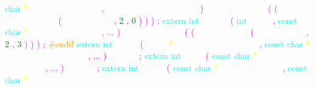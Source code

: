 \textcolor{cyan}{char} 
\textcolor{yellow}{*} 
\textcolor{white}{\_\_restrict} 
\textcolor{white}{\_\_fmt} 
\textcolor{magenta}{,} 
\textcolor{white}{\_\_gnuc\_va\_list} 
\textcolor{white}{\_\_arg} 
\textcolor{magenta}{)} 
\textcolor{white}{\_\_attribute\_\_} 
\textcolor{magenta}{(} 
\textcolor{magenta}{(} 
\textcolor{white}{\_\_format\_\_} 
\textcolor{magenta}{(} 
\textcolor{white}{\_\_printf\_\_} 
\textcolor{magenta}{,} 
\textcolor{green}{2} 
\textcolor{magenta}{,} 
\textcolor{green}{0} 
\textcolor{magenta}{)} 
\textcolor{magenta}{)} 
\textcolor{magenta}{)} 
\textcolor{magenta}{;} 
\textcolor{cyan}{extern} 
\textcolor{cyan}{int} 
\textcolor{white}{dprintf} 
\textcolor{magenta}{(} 
\textcolor{cyan}{int} 
\textcolor{white}{\_\_fd} 
\textcolor{magenta}{,} 
\textcolor{cyan}{const} 
\textcolor{cyan}{char} 
\textcolor{yellow}{*} 
\textcolor{white}{\_\_restrict} 
\textcolor{white}{\_\_fmt} 
\textcolor{magenta}{,} 
\textcolor{magenta}{...} 
\textcolor{magenta}{)} 
\textcolor{white}{\_\_attribute\_\_} 
\textcolor{magenta}{(} 
\textcolor{magenta}{(} 
\textcolor{white}{\_\_format\_\_} 
\textcolor{magenta}{(} 
\textcolor{white}{\_\_printf\_\_} 
\textcolor{magenta}{,} 
\textcolor{green}{2} 
\textcolor{magenta}{,} 
\textcolor{green}{3} 
\textcolor{magenta}{)} 
\textcolor{magenta}{)} 
\textcolor{magenta}{)} 
\textcolor{magenta}{;} 
\textcolor{orange}{\#endif} 
\textcolor{cyan}{extern} 
\textcolor{cyan}{int} 
\textcolor{white}{fscanf} 
\textcolor{magenta}{(} 
\textcolor{white}{FILE} 
\textcolor{yellow}{*} 
\textcolor{white}{\_\_restrict} 
\textcolor{white}{\_\_stream} 
\textcolor{magenta}{,} 
\textcolor{cyan}{const} 
\textcolor{cyan}{char} 
\textcolor{yellow}{*} 
\textcolor{white}{\_\_restrict} 
\textcolor{white}{\_\_format} 
\textcolor{magenta}{,} 
\textcolor{magenta}{...} 
\textcolor{magenta}{)} 
\textcolor{white}{\_\_wur} 
\textcolor{magenta}{;} 
\textcolor{cyan}{extern} 
\textcolor{cyan}{int} 
\textcolor{white}{scanf} 
\textcolor{magenta}{(} 
\textcolor{cyan}{const} 
\textcolor{cyan}{char} 
\textcolor{yellow}{*} 
\textcolor{white}{\_\_restrict} 
\textcolor{white}{\_\_format} 
\textcolor{magenta}{,} 
\textcolor{magenta}{...} 
\textcolor{magenta}{)} 
\textcolor{white}{\_\_wur} 
\textcolor{magenta}{;} 
\textcolor{cyan}{extern} 
\textcolor{cyan}{int} 
\textcolor{white}{sscanf} 
\textcolor{magenta}{(} 
\textcolor{cyan}{const} 
\textcolor{cyan}{char} 
\textcolor{yellow}{*} 
\textcolor{white}{\_\_restrict} 
\textcolor{white}{\_\_s} 
\textcolor{magenta}{,} 
\textcolor{cyan}{const} 
\textcolor{cyan}{char} 
\textcolor{yellow}{*} 
\textcolor{white}{\_\_restrict} 
\textcolor{white}{\_\_format} 
